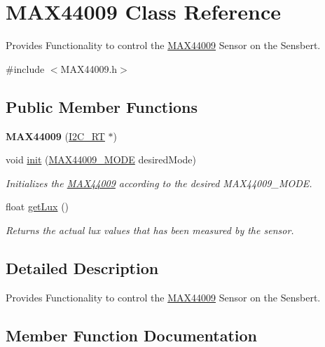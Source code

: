 \hypertarget{class_m_a_x44009}{}\section{M\+A\+X44009 Class Reference}
\label{class_m_a_x44009}


Provides Functionality to control the \hyperlink{class_m_a_x44009}{M\+A\+X44009} Sensor on the Sensbert.  




{\ttfamily \#include $<$M\+A\+X44009.\+h$>$}

\subsection*{Public Member Functions}
\begin{DoxyCompactItemize}
\item 
\hypertarget{class_m_a_x44009_ae1d681fb3ef13e120f99ab90fe61c3ec}{}{\bfseries M\+A\+X44009} (\hyperlink{class_i2_c___r_t}{I2\+C\+\_\+\+R\+T} $\ast$)\label{class_m_a_x44009_ae1d681fb3ef13e120f99ab90fe61c3ec}

\item 
void \hyperlink{class_m_a_x44009_afdfa40a7cbac539ce4209a73c4879060}{init} (\hyperlink{_m_a_x44009_config_8h_a2c5c90cfcbd78cedaaf2c20e01b00b56}{M\+A\+X44009\+\_\+\+M\+O\+D\+E} desired\+Mode)
\begin{DoxyCompactList}\small\item\em Initializes the \hyperlink{class_m_a_x44009}{M\+A\+X44009} according to the desired M\+A\+X44009\+\_\+\+M\+O\+D\+E. \end{DoxyCompactList}\item 
float \hyperlink{class_m_a_x44009_afa0db33684b87ffb13b8768256f74efc}{get\+Lux} ()
\begin{DoxyCompactList}\small\item\em Returns the actual lux values that has been measured by the sensor. \end{DoxyCompactList}\end{DoxyCompactItemize}


\subsection{Detailed Description}
Provides Functionality to control the \hyperlink{class_m_a_x44009}{M\+A\+X44009} Sensor on the Sensbert. 

\subsection{Member Function Documentation}
\hypertarget{class_m_a_x44009_afa0db33684b87ffb13b8768256f74efc}{}
